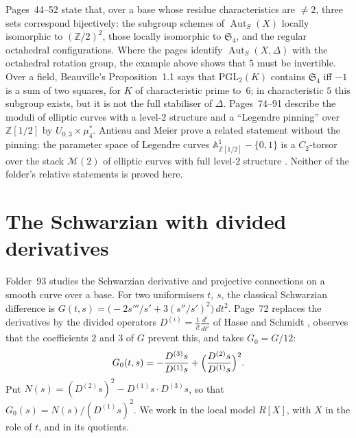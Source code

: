 \documentclass[11pt,a4paper]{amsart}
\theoremstyle{definition}
\theoremstyle{remark}
\newcommand{\Z}{\mathbb Z}
\newcommand{\PGL}{\mathrm{PGL}_2}
\begin{document}
Pages~44--52 state that, over a base whose residue characteristics are $\ne 2$, three sets correspond bijectively: the subgroup schemes of $\operatorname{Aut}_S(X)$ locally isomorphic to $(\Z/2)^2$, those locally isomorphic to $\mathfrak S_4$, and the regular octahedral configurations. Where the pages identify $\operatorname{Aut}_S(X, \Delta)$ with the octahedral rotation group, the example above shows that $5$ must be invertible. Over a field, Beauville's Proposition~1.1 \cite{beauville2010} says that $\PGL(K)$ contains $\mathfrak S_4$ iff $-1$ is a sum of two squares, for $K$ of characteristic prime to~$6$; in characteristic $5$ this subgroup exists, but it is not the full stabiliser of $\Delta$. Pages~74--91 describe the moduli of elliptic curves with a level-$2$ structure and a ``Legendre pinning'' over $\Z[1/2]$ by $U_{0,3} \times \mu_4^*$. Antieau and Meier prove a related statement without the pinning: the parameter space of Legendre curves $\mathbb A^1_{\Z[1/2]} - \{0, 1\}$ is a $C_2$-torsor over the stack $\mathcal M(2)$ of elliptic curves with full level-$2$ structure \cite[Definition~4.4 and Proposition~4.5, arXiv numbering]{antieaumeier2020}. Neither of the folder's relative statements is proved here.

\section{The Schwarzian with divided derivatives}\label{sec:schwarz}

Folder~93 studies the Schwarzian derivative and projective connections on a smooth curve over a base. For two uniformisers $t$, $s$, the classical Schwarzian difference is $G(t, s) = \bigl(-2s'''/s' + 3(s''/s')^2\bigr)\,dt^2$. Page~72 replaces the derivatives by the divided operators $D^{(i)} = \frac{1}{i!}\frac{d^i}{dt^i}$ of Hasse and Schmidt \cite{hasseschmidt1937}, observes that the coefficients $2$ and $3$ of $G$ prevent this, and takes $G_0 = G/12$:
\[
G_0(t, s) = -\frac{D^{(3)}s}{D^{(1)}s} + \Bigl(\frac{D^{(2)}s}{D^{(1)}s}\Bigr)^2.
\]
Put $N(s) = (D^{(2)}s)^2 - D^{(1)}s\cdot D^{(3)}s$, so that $G_0(s) = N(s)/(D^{(1)}s)^2$. We work in the local model $R[X]$, with $X$ in the role of $t$, and in its quotients.
\end{document}
